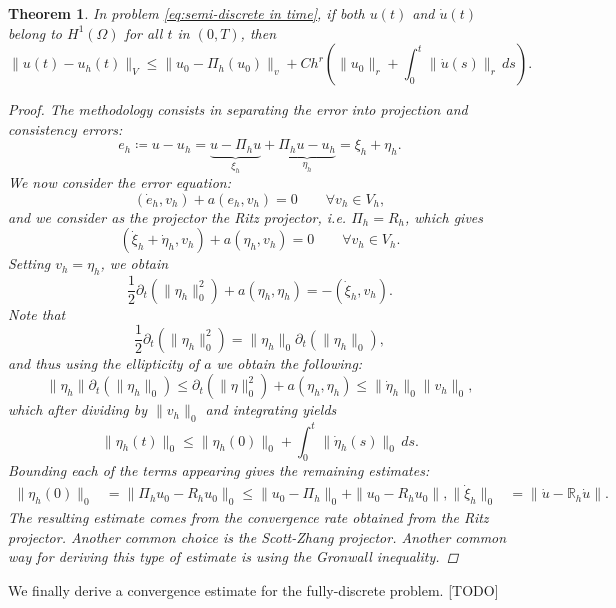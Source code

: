 \documentclass{article}
\newcommand{\R}{\mathbb{R}}
\newtheorem{theorem}{Theorem}
\begin{document}
\begin{theorem}
In problem \eqref{eq:semi-discrete in time}, if both $u(t)$ and $\dot u(t)$ belong to $H^1(\Omega)$ for all $t$ in $(0,T)$, then 
    $$ \| u(t) - u_h(t) \|_V \leq \|u_0 - \Pi_h(u_0)\|_v + Ch^r\left(\|u_0\|_r+\int_0^t\|\dot u(s)\|_r\,ds\right). $$
\begin{proof}
The methodology consists in separating the error into \emph{projection} and \emph{consistency} errors: 
    $$ e_h \coloneqq u - u_h = \underbrace{u - \Pi_h u}_{\xi_h} + \underbrace{\Pi_h u - u_h}_{\eta_h} = \xi_h + \eta_h. $$
We now consider the error equation: 
    $$ (\dot e_h, v_h) + a(e_h, v_h) = 0 \qquad \forall v_h\in V_h, $$
and we consider as the projector the Ritz projector, i.e. $\Pi_h=R_h$, which gives
    $$ (\dot \xi_h + \dot \eta_h, v_h) + a(\eta_h, v_h) = 0 \qquad \forall v_h\in V_h. $$
Setting $v_h = \eta_h$, we obtain 
    $$ \frac 1 2 \partial_t(\|\eta_h\|^2_0)+a(\eta_h,\eta_h) = -(\dot \xi_h, v_h). $$
Note that 
    $$ \frac 1 2 \partial_t(\|\eta_h\|_0^2) = \|\eta_h\|_0 \partial_t(\|\eta_h\|_0), $$
and thus using the ellipticity of $a$ we obtain the following: 
    $$ \|\eta_h\|\partial_t(\|\eta_h\|_0) \leq \partial_t(\|\eta\|_0^2) + a(\eta_h, \eta_h) \leq \|\dot \eta_h\|_0 \|v_h\|_0, $$
which after dividing by $\|v_h\|_0$ and integrating yields
    $$ \| \eta_h(t)\|_0 \leq \|\eta_h(0)\|_0 + \int_0^t \| \dot \eta_h(s) \|_0\,ds. $$
Bounding each of the terms appearing gives the remaining estimates: 
    \begin{align*}
        \| \eta_h(0) \|_0 &= \|\Pi_h u_0 - R_h u_0 \|_0 \leq \|u_0 - \Pi_h\|_0 + \| u_0 - R_h u_0\|, 
        \| \dot \xi_h \|_0 &= \| \dot u - \R_h \dot u \|.
    \end{align*}
The resulting estimate comes from the convergence rate obtained from the Ritz projector. Another common choice is the Scott-Zhang projector. Another common way for deriving this type of estimate is using the Gronwall inequality.
\end{proof}
\end{theorem}
We finally derive a convergence estimate for the fully-discrete problem. [TODO]



\end{document}
